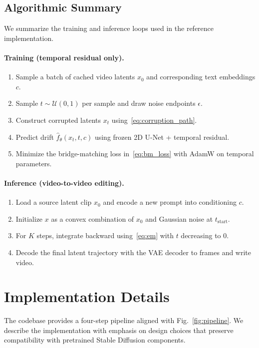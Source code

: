 \documentclass[journal]{IEEEtran}
\begin{document}
\subsection{Algorithmic Summary}
We summarize the training and inference loops used in the reference implementation.

\paragraph{Training (temporal residual only).}
\begin{enumerate}
\item Sample a batch of cached video latents $x_0$ and corresponding text embeddings $c$.
\item Sample $t\sim\mathcal{U}(0,1)$ per sample and draw noise endpoints $\epsilon$.
\item Construct corrupted latents $x_t$ using~\eqref{eq:corruption_path}.
\item Predict drift $\hat{f}_\theta(x_t,t,c)$ using frozen 2D U-Net + temporal residual.
\item Minimize the bridge-matching loss in~\eqref{eq:bm_loss} with AdamW on temporal parameters.
\end{enumerate}

\paragraph{Inference (video-to-video editing).}
\begin{enumerate}
\item Load a source latent clip $x_0$ and encode a new prompt into conditioning $c$.
\item Initialize $x$ as a convex combination of $x_0$ and Gaussian noise at $t_\mathrm{start}$.
\item For $K$ steps, integrate backward using~\eqref{eq:em} with $t$ decreasing to $0$.
\item Decode the final latent trajectory with the VAE decoder to frames and write video.
\end{enumerate}

\section{Implementation Details}
The codebase provides a four-step pipeline aligned with Fig.~\ref{fig:pipeline}. We describe the implementation with emphasis on design choices that preserve compatibility with pretrained Stable Diffusion components.
\end{document}
